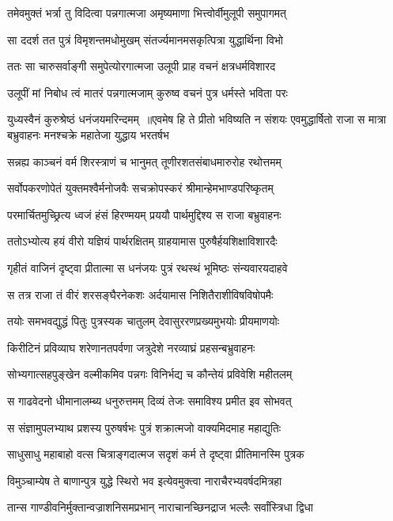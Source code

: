 \twolineshloka
{तमेवमुक्तं भर्त्रा तु विदित्वा पन्नगात्मजा}
{अमृष्यमाणा भित्त्वोर्वीमुलूपी समुपागमत्}


\twolineshloka
{सा ददर्श तत पुत्रं विमृशन्तमधोमुखम्}
{संतर्ज्यमानमसकृत्पित्रा युद्धार्थिना विभो}


\twolineshloka
{ततः सा चारुसर्वाङ्गी समुपेत्योरगात्मजा}
{उलूपी प्राह वचनं क्षत्रधर्मविशारद}


\twolineshloka
{उलूपीं मां निबोध त्वं मातरं पन्नगात्मजाम्}
{कुरुष्व वचनं पुत्र धर्मस्ते भविता परः}


युध्यस्वैनं कुरुश्रेष्ठं धनंजयमरिन्दमम् ॥एवमेष हि ते प्रीतो भविष्यति न संशयः
\twolineshloka
{एवमुद्धार्षितो राजा स मात्रा बभ्रुवाहनः}
{मनश्चक्रे महातेजा युद्धाय भरतर्षभ}


\twolineshloka
{सन्नह्य काञ्चनं वर्म शिरस्त्राणं च भानुमत्}
{तूणीरशतसंबाधमारुरोह रथोत्तमम्}


\twolineshloka
{सर्वोपकरणोपेतं युक्तमश्वैर्मनोजवैः}
{सचक्रोपस्करं श्रीमान्हेमभाण्डपरिष्कृतम्}


\twolineshloka
{परमार्चितमुच्छ्रित्य ध्वजं हंसं हिरण्मयम्}
{प्रययौ पार्थमुद्दिश्य स राजा बभ्रुवाहनः}


\twolineshloka
{ततोऽभ्योत्य हयं वीरो यज्ञियं पार्थरक्षितम्}
{ग्राहयामास पुरुषैर्हयशिक्षाविशारदैः}


\twolineshloka
{गृहीतं वाजिनं दृष्ट्वा प्रीतात्मा स धनंजयः}
{पुत्रं रथस्थं भूमिष्ठः संन्यवारयदाहवे}


\twolineshloka
{स तत्र राजा तं वीरं शरसङ्घैरनेकशः}
{अर्दयामास निशितैराशीविषविषोपमैः}


\twolineshloka
{तयोः समभवद्युद्धं पितुः पुत्रस्यक चातुलम्}
{देवासुररणप्रख्यमुभयोः प्रीयमाणयोः}


\twolineshloka
{किरीटिनं प्रविव्याघ शरेणानतपर्वणा}
{जत्रुदेशे नरव्याघ्रं प्रहसन्बभ्रुवाहनः}


\twolineshloka
{सोभ्यगात्सहपुङ्खेन वल्मीकमिव पन्नगः}
{विनिर्भद्य च कौन्तेयं प्रविवेशि महीतलम्}


\twolineshloka
{स गाढवेदनो धीमानालम्ब्य धनुरुत्तमम्}
{दिव्यं तेजः समाविश्य प्रमीत इव सोभवत्}


\twolineshloka
{स संज्ञामुपलभ्याथ प्रशस्य पुरुषर्षभः}
{पुत्रं शक्रात्मजो वाक्यमिदमाह महाद्युतिः}


\twolineshloka
{साधुसाधु महाबाहो वत्स चित्राङ्गदात्मज}
{सदृशं कर्म ते दृष्ट्वा प्रीतिमानस्मि पुत्रक}


\twolineshloka
{विमुञ्चाम्येष ते बाणान्पुत्र युद्धे स्थिरो भव}
{इत्येवमुक्त्वा नाराचैरभ्यवर्षदमित्रहा}


\twolineshloka
{तान्स गाण्डीवनिर्मुक्तान्वज्राशनिसमप्रभान्}
{नाराचानच्छिनद्राज भल्लैः सर्वांस्त्रिधा द्विधा}


